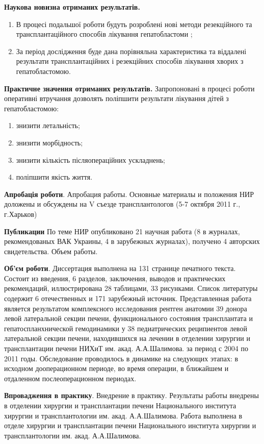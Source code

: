 \textbf{Наукова новизна отриманих результатів.} 
\begin{enumerate}
    \item В процесі подальшої роботи будуть розроблені нові методи резекційного та трансплантаційного способів лікування гепатобластоми ;

    \item За період дослідження буде дана порівняльна характеристика та віддалені результати трансплантаційних і резекційних способів лікування хворих з гепатобластомою.
\end{enumerate}

\textbf{Практичне значення отриманих результатів.} 
Запропоновані в процесі роботи оперативні втручання дозволять поліпшити результати лікування дітей з гепатобластомою:
\begin{enumerate}
    \item знизити летальність;
    
    \item знизити морбідность;
    
    \item знизити кількість післяопераційних ускладнень;
    
    \item поліпшити якість життя.
\end{enumerate}

\textbf{Апробація роботи}. 
Апробация работы. Основные материалы и положения НИР доложены и обсуждены на V съезде трансплантологов (5-7 октября 2011 г., г.Харьков) 

\textbf{Публикации} 
По теме НИР опубликовано 21  научная работа (8 в журналах, рекомендованых ВАК Украины, 4 в зарубежных журналах), получено 4 авторских свидетельства.
Объем работы. 

\textbf{Об'єм роботи}. 
Диссертация выполнена на 131 странице печатного текста. Состоит из введения, 6 разделов, заключения, выводов и практических рекомендаций, иллюстрирована 28 таблицами, 33 рисунками. Список литературы содержит 6 отечественных и 171 зарубежный источник. Представленная работа является результатом комплексного исследования рентген анатомии 39 донора левой латеральной секции печени,  функционального  состояния трансплантата и гепатоспланхнической гемодинамики у 38 педиатрических реципиентов левой латеральной секции печени, находившихся на лечении в отделении хирургии и трансплантации печени НИХиТ им. акад. А.А.Шалимова.  за период  с 2004 по 2011 годы.
Обследование проводилось в динамике на следующих этапах: в исходном дооперационном периоде, во время операции, в ближайшем и отдаленном послеоперационном периодах.

\textbf{Впровадження в практику}. 
Внедрение в практику. Результаты работы внедрены в отделении хирургии и трансплантации печени Национального института хирургии и трансплантологии им. акад. А.А.Шалимова.
Работа выполнена в отделе хирургии и трансплантации печени Национального института хирургии и трансплантологии им. акад. А.А.Шалимова.
